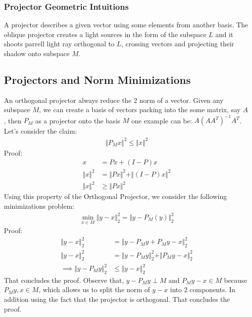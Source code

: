 \documentclass[]{article}
\theoremstyle{definition}
\begin{document}
            \subsubsection{Projector Geometric Intuitions}
                A projector describes a given vector using some elements from another basis. The oblique projector creates a light sources in the form of the subspace $L$ and it shoots parrell light ray orthogonal to $L$, crossing vectors and projecting their shadow onto subspace $M$. 
            

    \subsection{Projectors and Norm Minimizations}
        An orthogonal projector always reduce the 2 norm of a vector. Given any subspace $M$, we can create a basis of vectors packing into the some matrix, say $A$, then $P_M$ as a projector onto the basis $M$ one example can be: $A(AA^T)^{-1}A^T$. Let's consider the claim: 
        \begin{align}
            \Vert P_Mx\Vert^2 \le \Vert x\Vert^2
        \end{align}
        Proof: 
        \begin{align}
            x &= Px + (I - P)x 
            \\
            \Vert x\Vert^2 &= \Vert Px\Vert^2 + \Vert (I - P)x\Vert^2
            \\
            \Vert x\Vert^2 &\ge \Vert Px\Vert^2
        \end{align}
        Using this property of the Orthogonal Projector, we consider the following minimizations problem: 
        \begin{align}
            \min_{x\in M} \Vert y - x\Vert_2^2 = \Vert y - P_M(y)\Vert_2^2
        \end{align}
        Proof:
        \begin{align}
            \Vert y - x\Vert_2^2 &= 
            \Vert y - P_My + P_My - x\Vert_2^2
            \\
            \Vert y - x\Vert_2^2 &= 
            \Vert y - P_My\Vert_2^2 + \Vert P_My - x\Vert_2^2
            \\
            \implies 
            \Vert y - P_My\Vert_2^2 &\le \Vert y - x\Vert_2^2
        \end{align}
        That concludes the proof. Observe that, $y - P_My\perp M$ and $P_My - x \in M$ because $P_My, x \in M$, which allows us to split the norm of $y - x$ into 2 components. In addition using the fact that the projector is orthogonal. That concludes the proof. 
\end{document}
